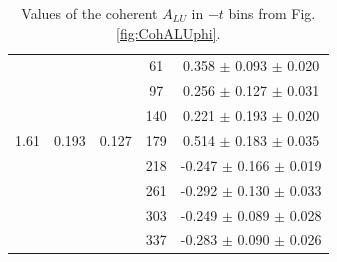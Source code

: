 \documentclass{article}
\begin{document}
\begin{table}[!h]
\begin{center}
\begin{tabular}{|c|c|c|c|c|}
        &       &       &  61   &  0.358  $\pm$ 0.093  $\pm$ 0.020  \\
        &       &       &  97   &  0.256  $\pm$ 0.127  $\pm$ 0.031  \\
        &       &       & 140   &  0.221  $\pm$ 0.193  $\pm$ 0.020  \\
  1.61  & 0.193 & 0.127 & 179   &  0.514  $\pm$ 0.183  $\pm$ 0.035  \\
        &       &       & 218   & -0.247  $\pm$ 0.166  $\pm$ 0.019  \\
        &       &       & 261   & -0.292  $\pm$ 0.130  $\pm$ 0.033  \\
        &       &       & 303   & -0.249  $\pm$ 0.089  $\pm$ 0.028  \\
        &       &       & 337   & -0.283  $\pm$ 0.090  $\pm$ 0.026  \\
         \hline
      \end{tabular}
      \caption{Values of the coherent $A_{LU}$ in $-t$ bins from Fig. \ref{fig:CohALUphi}.}
      \label{table:Coh_t_BSA}
   \end{center}
\end{table}

\end{document}

